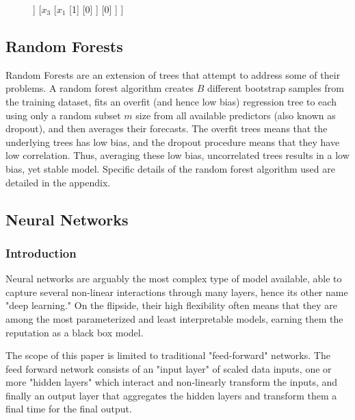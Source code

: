 \documentclass[man, a4paper, biblatex]{article}
\begin{document}
\begin{figure}
	\begin{center}
		\begin{forest} 
			[$x_2$, tikz={\draw[{Latex}-, thick] (.north) --++ (0,1);}
			[$x_1$
			[1] 
			[0] 
			]   
			[$x_3$
			[$x_1$
			[1] 
			[0] 
			]   
			[0] 
			]   
			] 
		\end{forest}
	\end{center}
\end{figure}

\subsection{Random Forests}
Random Forests are an extension of trees that attempt to address some of their problems. A random forest algorithm creates $B$ different bootstrap samples from the training dataset, fits an overfit (and hence low bias) regression tree to each using only a random subset $m$ size from all available predictors (also known as dropout), and then averages their forecasts. The overfit trees means that the underlying trees has low bias, and the dropout procedure means that they have low correlation. Thus, averaging these low bias, uncorrelated trees results in a low bias, yet stable model. Specific details of the random forest algorithm used are detailed in the appendix.

\subsection{Neural Networks}

\subsubsection{Introduction}

Neural networks are arguably the most complex type of model available, able to capture several non-linear interactions through many layers, hence its other name "deep learning." On the flipside, their high flexibility often means that they are among the most parameterized and least interpretable models, earning them the reputation as a black box model.

The scope of this paper is limited to traditional "feed-forward" networks. The feed forward network consists of an "input layer" of scaled data inputs, one or more "hidden layers" which interact and non-linearly transform the inputs, and finally an output layer that aggregates the hidden layers and transform them a final time for the final output. 
\end{document}
